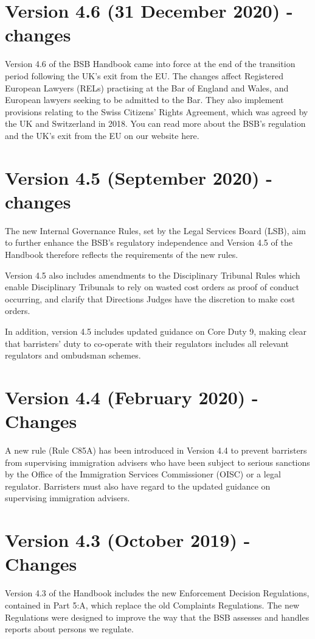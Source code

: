 \section*{Version 4.6 (31 December 2020) - changes}
Version 4.6 of the BSB Handbook came into force at the end of the transition period following the UK’s exit from the EU. The changes affect Registered European Lawyers (RELs) practising at the Bar of England and Wales, and European lawyers seeking to be admitted to the Bar. They also implement provisions relating to the Swiss Citizens’ Rights Agreement, which was agreed by the UK and Switzerland in 2018. You can read more about the BSB’s regulation and the UK’s exit from the EU on our website here.

\section*{Version 4.5 (September 2020) - changes}
The new Internal Governance Rules, set by the Legal Services Board (LSB), aim to further enhance the BSB’s regulatory independence and Version 4.5 of the Handbook therefore reflects the requirements of the new rules.

Version 4.5 also includes amendments to the Disciplinary Tribunal Rules which enable Disciplinary Tribunals to rely on wasted cost orders as proof of conduct occurring, and clarify that Directions Judges have the discretion to make cost orders.

In addition, version 4.5 includes updated guidance on Core Duty 9, making clear that barristers’ duty to co-operate with their regulators includes all relevant regulators and ombudsman schemes.

\section*{Version 4.4 (February 2020) - Changes}
A new rule (Rule C85A) has been introduced in Version 4.4 to prevent barristers from supervising immigration advisers who have been subject to serious sanctions by the Office of the Immigration Services Commissioner (OISC) or a legal regulator. Barristers must also have regard to the updated guidance on supervising immigration advisers.

\section*{Version 4.3 (October 2019) - Changes}
Version 4.3 of the Handbook includes the new Enforcement Decision Regulations, contained in Part 5:A, which replace the old Complaints Regulations. The new Regulations were designed to improve the way that the BSB assesses and handles reports about persons we regulate.

